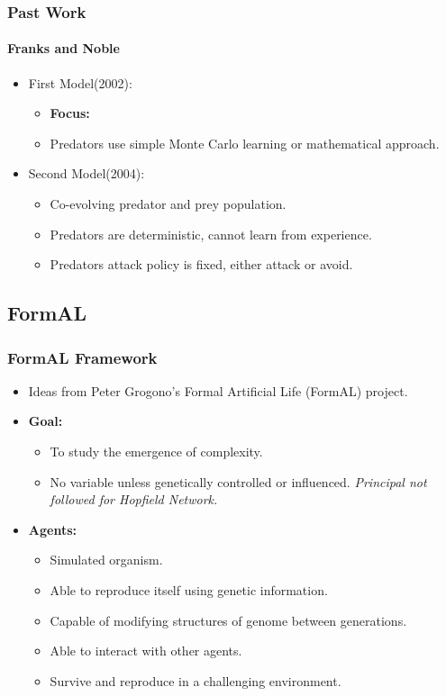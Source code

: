 
\frame
{
	\frametitle{Past Work}
	\framesubtitle{Franks and Noble}

	\begin{itemize}
		\item First Model(2002):
			\begin{itemize}
				\item \textbf{Focus:} 
				\item Predators use simple Monte Carlo learning or mathematical approach.
			\end{itemize}
		\item Second Model(2004):
			\begin{itemize}
				\item Co-evolving predator and prey population.
				\item Predators are deterministic, cannot learn from experience.
				\item Predators attack policy is fixed, either attack or avoid.
			\end{itemize}
	\end{itemize}
}


\subsection{FormAL}

\frame
{
	\frametitle{FormAL Framework}
	
	\begin{itemize}
		\item Ideas from Peter Grogono's Formal Artificial Life (FormAL) project.
		\item \textbf{Goal:}		
			\begin{itemize}
				\item To study the emergence of complexity.
				\item No variable unless genetically controlled or influenced. \textit{Principal not followed for Hopfield Network.}
			\end{itemize}
		\item \textbf{Agents:}
			\begin{itemize}
				\item Simulated organism.
				\item Able to reproduce itself using genetic information.
				\item Capable of modifying structures of genome between generations.
				\item Able to interact with other agents.
				\item Survive and reproduce in a challenging environment.
			\end{itemize}
	\end{itemize}
	
}

